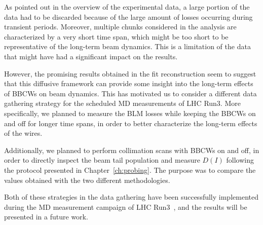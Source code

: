 As pointed out in the overview of the experimental data, a large portion of the data had to be discarded because of the large amount of losses occurring during transient periods. Moreover, multiple chunks considered in the analysis are characterized by a very short time span, which might be too short to be representative of the long-term beam dynamics. This is a limitation of the data that might have had a significant impact on the results.

However, the promising results obtained in the fit reconstruction seem to suggest that this diffusive framework can provide some insight into the long-term effects of BBCWs on beam dynamics. This has motivated us to consider a different data gathering strategy for the scheduled MD measurements of LHC Run3. More specifically, we planned to measure the BLM losses while keeping the BBCWs on and off for longer time spans, in order to better characterize the long-term effects of the wires.

Additionally, we planned to perform collimation scans with BBCWs on and off, in order to directly inspect the beam tail population and measure $D(I)$ following the protocol presented in Chapter~\ref{ch:probing}. The purpose was to compare the values obtained with the two different methodologies.

Both of these strategies in the data gathering have been successfully implemented during the MD measurement campaign of LHC Run3~\cite{}, and the results will be presented in a future work.